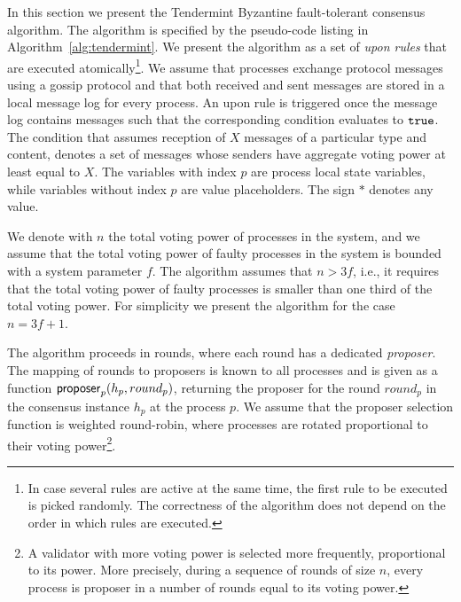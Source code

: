 In this section we present the Tendermint Byzantine fault-tolerant consensus algorithm. 
The algorithm is specified by the pseudo-code listing in Algorithm~\ref{alg:tendermint}. We present the algorithm as a set of \emph{upon rules} that are executed atomically\footnote{In case several rules are active at the same time, the first rule to be executed is picked randomly. The correctness of the algorithm does not depend on the order in which rules are executed.}. We assume that processes exchange protocol messages using a gossip protocol and that both received and sent messages are stored in a local message log for every process. An upon rule is triggered once the message log contains messages such that the corresponding condition evaluates to $\tt{true}$. The condition that assumes reception of $X$ messages of a particular type and content, denotes a set of messages whose senders have aggregate voting power at least equal to $X$. The variables with index $p$ are process local state variables, while variables without index $p$ are value placeholders. The sign $*$ denotes any value.    

We denote with $n$ the total voting power of processes in the system, and we assume that the total voting power of faulty processes in the system is bounded with a system parameter $f$. 
The algorithm assumes that $n > 3f$, i.e., it requires that the total voting power of faulty processes is smaller than one third of the total voting power. For simplicity we present the algorithm for the case $n = 3f + 1$.

The algorithm proceeds in rounds, where each round has a dedicated \emph{proposer}. The mapping of rounds to proposers is known to all processes and is given as a function $\mathsf{proposer}_p(h_p, round_p)$, returning the proposer for the round $round_p$ in the consensus instance $h_p$ at the process $p$. We assume that the proposer selection function is weighted round-robin, where processes are rotated proportional to their voting power\footnote{A validator with more voting power is selected more frequently, proportional to its power. More precisely, during a sequence of rounds of size $n$, every process is proposer in a number of rounds equal to its voting power.}. 

